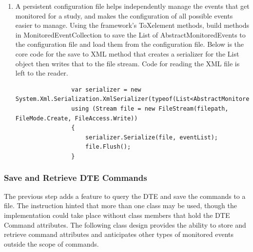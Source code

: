 \begin{enumerate}
\item
A persistent configuration file helps independently manage the events that get monitored for a study, and makes the configuration of all possible events easier to manage.    Using the framework's ToXelement methods, build methods in MonitoredEventCollection to save the List of AbstractMonitoredEvents to the configuration file and load them from the configuration file.  Below is the core code for the save to XML method that creates a serializer for the List object then writes that to the file stream.  Code for reading the XML file is left to the reader.

\begin{lstlisting}
                var serializer = new System.Xml.Serialization.XmlSerializer(typeof(List<AbstractMonitoredEvent>));
                using (Stream file = new FileStream(filepath, FileMode.Create, FileAccess.Write))
                {
                    serializer.Serialize(file, eventList);
                    file.Flush();
                }
\end{lstlisting}

\end{enumerate}

\subsubsection{Save and Retrieve DTE Commands}

The previous step adds a feature to query the DTE and save the commands to a file.  The instruction hinted that more than one class may be used, though the implementation could take place without class members that hold the DTE Command attributes.  The following class design provides the ability to store and retrieve command attributes and anticipates other types of monitored events outside the scope of commands.

